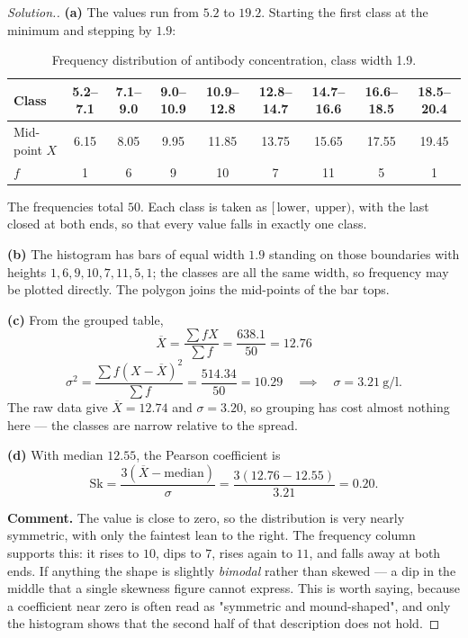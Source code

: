 \documentclass[11pt,a4paper]{article}
\theoremstyle{definition}
\newenvironment{solution}
  {\renewcommand{\qedsymbol}{}\begin{proof}[\textit{Solution}.]}
  {\end{proof}}
\begin{document}
\begin{solution}
\textbf{(a)} The values run from $5.2$ to $19.2$. Starting the first class at the minimum and
stepping by $1.9$:
\begin{table}[H]
\centering
\begin{tabular}{|l|c|c|c|c|c|c|c|c|}
\hline
Class & 5.2--7.1 & 7.1--9.0 & 9.0--10.9 & 10.9--12.8 & 12.8--14.7 & 14.7--16.6 & 16.6--18.5 & 18.5--20.4\\
\hline
Mid-point $X$ & 6.15 & 8.05 & 9.95 & 11.85 & 13.75 & 15.65 & 17.55 & 19.45\\
$f$ & 1 & 6 & 9 & 10 & 7 & 11 & 5 & 1\\
\hline
\end{tabular}
\caption{Frequency distribution of antibody concentration, class width 1.9.}
\end{table}
The frequencies total $50$. Each class is taken as $[\,\text{lower},\ \text{upper})$, with the
last closed at both ends, so that every value falls in exactly one class.

\textbf{(b)} The histogram has bars of equal width $1.9$ standing on those boundaries with
heights $1, 6, 9, 10, 7, 11, 5, 1$; the classes are all the same width, so frequency may be
plotted directly. The polygon joins the mid-points of the bar tops.

\textbf{(c)} From the grouped table,
\[\overline{X}=\frac{\sum fX}{\sum f}=\frac{638.1}{50}=12.76\]
\[\sigma^2=\frac{\sum f(X-\overline{X})^2}{\sum f}=\frac{514.34}{50}=10.29
\quad\implies\quad \sigma=3.21\ \text{g/l}.\]
The raw data give $\overline{X}=12.74$ and $\sigma=3.20$, so grouping has cost almost nothing
here --- the classes are narrow relative to the spread.

\textbf{(d)} With median $12.55$, the Pearson coefficient is
\[\text{Sk}=\frac{3(\overline{X}-\text{median})}{\sigma}=\frac{3(12.76-12.55)}{3.21}=0.20.\]

\textbf{Comment.} The value is close to zero, so the distribution is very nearly symmetric,
with only the faintest lean to the right. The frequency column supports this: it rises to
$10$, dips to $7$, rises again to $11$, and falls away at both ends. If anything the shape is
slightly \emph{bimodal} rather than skewed --- a dip in the middle that a single skewness
figure cannot express. This is worth saying, because a coefficient near zero is often read as
"symmetric and mound-shaped", and only the histogram shows that the second half of that
description does not hold.
\end{solution}
\end{document}
